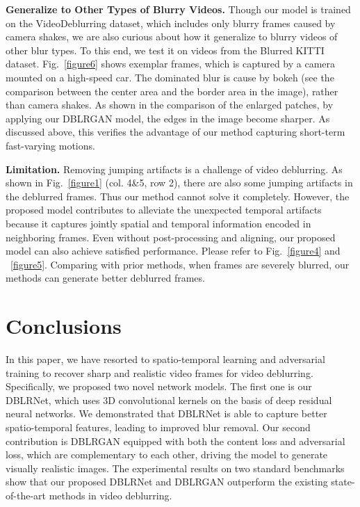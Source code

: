 \documentclass[journal]{IEEEtran}
\begin{document}
\textbf{Generalize to Other Types of Blurry Videos.} Though our model is trained on the VideoDeblurring dataset, which includes only blurry frames caused by camera shakes, we are also curious about how it generalize to blurry videos of other blur types. To this end, we test it on videos from the Blurred KITTI dataset. Fig.~\ref{figure6} shows exemplar frames, which is captured by a camera mounted on a high-speed car. The dominated blur is cause by bokeh (see the comparison between the center area and the border area in the image), rather than camera shakes. As shown in the comparison of the enlarged patches, by applying our DBLRGAN model, the edges in the image become sharper. As discussed above, this verifies the advantage of our method capturing short-term fast-varying motions.

\textbf{Limitation.} Removing jumping artifacts is a challenge of video deblurring. As shown in Fig.~\ref{figure1} (col. 4\&5, row 2), there are also some jumping artifacts in the deblurred frames. Thus our method cannot solve it completely. However, the proposed model contributes to alleviate the unexpected temporal artifacts because it captures jointly spatial and temporal information encoded in neighboring frames. Even without post-processing and aligning, our proposed model can also achieve satisfied performance. Please refer to Fig.~\ref{figure4} and ~\ref{figure5}. Comparing with prior methods, when frames are severely blurred, our methods can generate better deblurred frames.


\section{Conclusions}
In this paper, we have resorted to spatio-temporal learning and adversarial training to recover sharp and realistic video frames for video deblurring. Specifically, we proposed two novel network models. The first one is our DBLRNet, which uses 3D convolutional kernels on the basis of deep residual neural networks. We demonstrated that DBLRNet is able to capture better spatio-temporal features, leading to improved blur removal. Our second contribution is DBLRGAN equipped with both the content loss and adversarial loss, which are complementary to each other, driving the model to generate visually realistic images. The experimental results on two standard benchmarks show that our proposed DBLRNet and DBLRGAN outperform the existing state-of-the-art methods in video deblurring.
\end{document}
